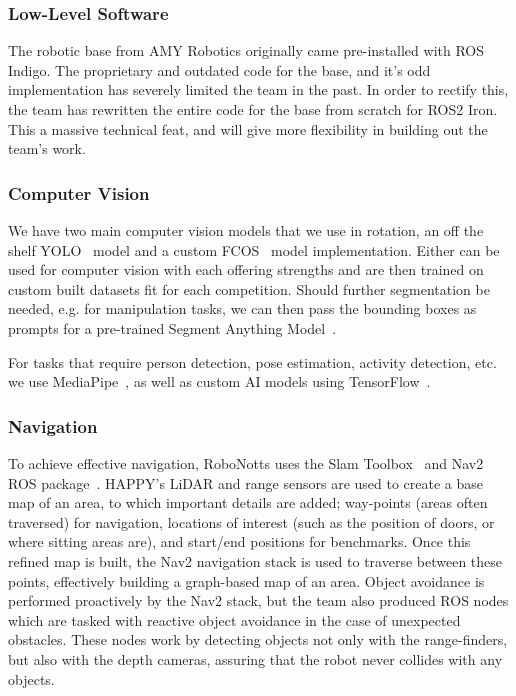 \subsubsection{Low-Level Software}

The robotic base from AMY Robotics originally came pre-installed with ROS Indigo. The proprietary and outdated code for the base, and it's odd implementation has severely limited the team in the past. In order to rectify this, the team has rewritten the entire code for the base from scratch for ROS2 Iron. This a massive technical feat, and will give more flexibility in building out the team's work.

\subsubsection{Computer Vision}

We have two main computer vision models that we use in rotation, an off the shelf YOLO~\cite{yolo} model and a custom FCOS~\cite{fcos} model implementation. Either can be used for computer vision with each offering strengths and are then trained on custom built datasets fit for each competition. Should further segmentation be needed, e.g. for manipulation tasks, we can then pass the bounding boxes as prompts for a pre-trained Segment Anything Model~\cite{sam}.

For tasks that require person detection, pose estimation, activity detection, etc. we use MediaPipe~\cite{mp}, as well as custom AI models using TensorFlow~\cite{tf}.

\subsubsection{Navigation}

To achieve effective navigation, RoboNotts uses the Slam Toolbox~\cite{slamtb} and Nav2 ROS package~\cite{nav2}. HAPPY's LiDAR and range sensors are used to create a base map of an area, to which important details are added; way-points (areas often traversed) for navigation, locations of interest (such as the position of doors, or where sitting areas are), and start/end positions for benchmarks. Once this refined map is built, the Nav2 navigation stack is used to traverse between these points, effectively building a graph-based map of an area.
Object avoidance is performed proactively by the Nav2 stack, but the team also produced ROS nodes which are tasked with reactive object avoidance in the case of unexpected obstacles. These nodes work by detecting objects not only with the range-finders, but also with the depth cameras, assuring that the robot never collides with any objects. 


